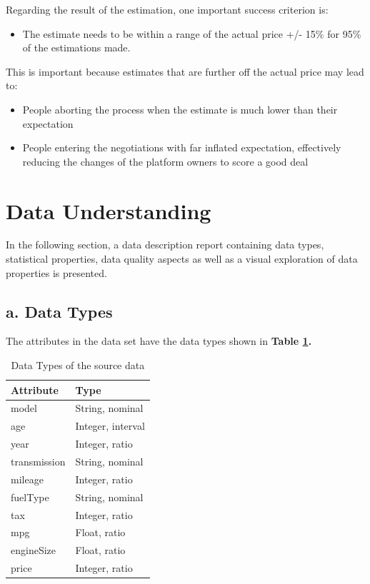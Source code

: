 \documentclass[sigchi]{acmart}
\def\tightlist{}
\begin{document}
Regarding the result of the estimation, one important success criterion is:

\begin{itemize}
\tightlist
\item
  The estimate needs to be within a range of the actual price +/- 15\% for 95\% of the estimations made.
\end{itemize}

This is important because estimates that are further off the actual price may lead to:

\begin{itemize}
\tightlist
\item
  People aborting the process when the estimate is much lower than their expectation
\item
  People entering the negotiations with far inflated expectation, effectively reducing the changes of the platform owners to score a good deal
\end{itemize}

\hypertarget{data-understanding}{%
\section{Data Understanding}\label{data-understanding}}

In the following section, a data description report containing data types, statistical properties, data quality aspects as well as a visual exploration of data properties is presented.

\hypertarget{a.-data-types}{%
\subsection{a. Data Types}\label{a.-data-types}}

The attributes in the data set have the data types shown in \textbf{Table \ref{tab:table-datatypes}.}

\begin{table}

\caption{\label{tab:table-datatypes}Data Types of the source data}
\centering
\begin{tabular}[t]{ll}
\toprule
Attribute & Type\\
\midrule
model & String, nominal\\
age & Integer, interval\\
year & Integer, ratio\\
transmission & String, nominal\\
mileage & Integer, ratio\\
\addlinespace
fuelType & String, nominal\\
tax & Integer, ratio\\
mpg & Float, ratio\\
engineSize & Float, ratio\\
price & Integer, ratio\\
\bottomrule
\end{tabular}
\end{table}
\end{document}
